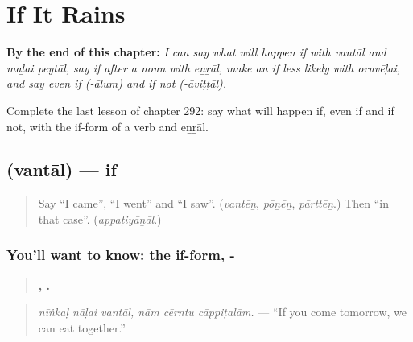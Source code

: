 
\chapter{If It Rains}
\label{ch:ta-if-it-rains}

\begin{chapteropening}
\textbf{By the end of this chapter:} \emph{I can say what will happen if with vantāl and maḻai peytāl, say if after a noun with eṉṟāl, make an if less likely with oruvēḷai, and say even if (-ālum) and if not (-āviṭṭāl).}

Complete the last lesson of chapter 292: say what will happen if, even if and if not, with the if-form of a verb and eṉṟāl.
\end{chapteropening}

\section[\texorpdfstring{\ta{வந்தால்} (vantāl)}{வந்தால் (vantāl)}]{ (vantāl) — if}

\label{lesson:TA-C292-vantal}



\begin{quote}
Say \textquotedblleft{}I came\textquotedblright{}, \textquotedblleft{}I went\textquotedblright{} and \textquotedblleft{}I saw\textquotedblright{}. (\emph{vantēṉ}, \emph{pōṉēṉ}, \emph{pārttēṉ}.) Then \textquotedblleft{}in that case\textquotedblright{}. (\emph{appaṭiyāṉāl}.)
\end{quote}

\subsection*{You'll want to know: the if-form, -}
\begin{quote}
\textbf{  ,   .}
\end{quote}

\begin{quote}
\emph{nīṅkaḷ nāḷai vantāl, nām cērntu cāppiṭalām.} — \textquotedblleft{}If you come tomorrow, we can eat together.\textquotedblright{}
\end{quote}

